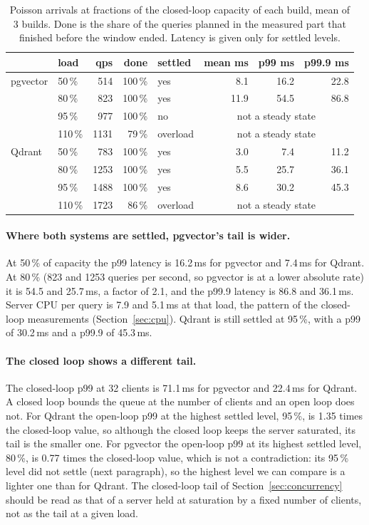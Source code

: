 \documentclass[preprint,12pt]{elsarticle}
\begin{document}
\begin{table}[t]
  \caption{Poisson arrivals at fractions of the closed-loop capacity of each build, mean of 3 builds. Done is the
  share of the queries planned in the measured part that finished before the window ended. Latency is given only for settled levels.}
  \label{tab:openloop}
  \small
  \begin{tabular}{@{}llrrlrrr@{}}
    \toprule
    & load & qps & done & settled & mean ms & p99 ms & p99.9 ms \\
    \midrule
    pgvector & 50\,\% & 514 & 100\,\% & yes & 8.1 & 16.2 & 22.8 \\
     & 80\,\% & 823 & 100\,\% & yes & 11.9 & 54.5 & 86.8 \\
     & 95\,\% & 977 & 100\,\% & no & \multicolumn{3}{c}{not a steady state} \\
     & 110\,\% & 1131 & 79\,\% & overload & \multicolumn{3}{c}{not a steady state} \\
    \addlinespace
    Qdrant & 50\,\% & 783 & 100\,\% & yes & 3.0 & 7.4 & 11.2 \\
     & 80\,\% & 1253 & 100\,\% & yes & 5.5 & 25.7 & 36.1 \\
     & 95\,\% & 1488 & 100\,\% & yes & 8.6 & 30.2 & 45.3 \\
     & 110\,\% & 1723 & 86\,\% & overload & \multicolumn{3}{c}{not a steady state} \\
    \bottomrule
  \end{tabular}
\end{table}

\paragraph{Where both systems are settled, pgvector's tail is wider.} At 50\,\% of capacity the p99 latency is 16.2\,ms for pgvector and
7.4\,ms for Qdrant. At 80\,\% (823 and 1253 queries per second, so pgvector is at a lower absolute rate) it is 54.5
and 25.7\,ms, a factor of 2.1, and the p99.9 latency is 86.8 and 36.1\,ms. Server CPU per query is
7.9 and 5.1\,ms at that load, the pattern of the closed-loop measurements (Section~\ref{sec:cpu}). Qdrant is still settled at
95\,\%, with a p99 of 30.2\,ms and a p99.9 of 45.3\,ms.

\paragraph{The closed loop shows a different tail.} The closed-loop p99 at 32 clients is 71.1\,ms for pgvector and 22.4\,ms for Qdrant. A closed loop bounds the
queue at the number of clients and an open loop does not. For Qdrant the open-loop p99 at the highest settled level, 95\,\%, is 1.35 times the closed-loop value, so
although the closed loop keeps the server saturated, its tail is the smaller one. For pgvector the open-loop p99 at its highest settled level, 80\,\%, is
0.77 times the closed-loop value, which is not a contradiction: its 95\,\% level did not settle (next paragraph), so the highest level we can compare is a lighter one than for Qdrant.
The closed-loop tail of Section~\ref{sec:concurrency} should be read as that of a server held at saturation by a fixed number of clients, not as the tail at a given load.
\end{document}
